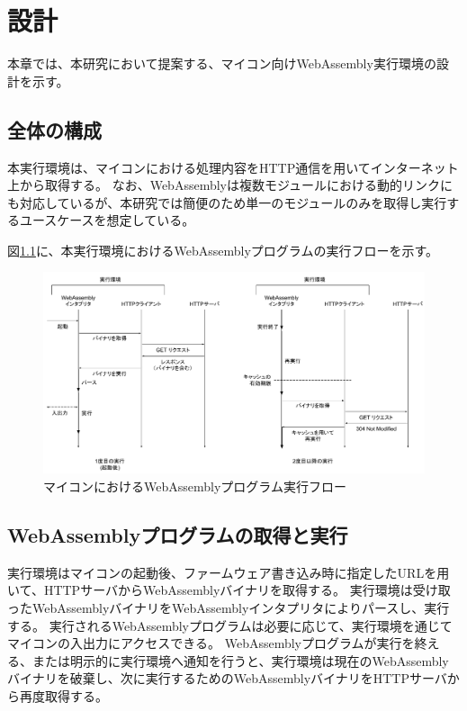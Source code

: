 \chapter{設計}
\label{chap:design}

本章では、本研究において提案する、マイコン向けWebAssembly実行環境の設計を示す。

\section{全体の構成}

本実行環境は、マイコンにおける処理内容をHTTP通信を用いてインターネット上から取得する。
なお、WebAssemblyは複数モジュールにおける動的リンクにも対応しているが、本研究では簡便のため単一のモジュールのみを取得し実行するユースケースを想定している。

図\ref{fig:wasm_design}に、本実行環境におけるWebAssemblyプログラムの実行フローを示す。

\begin{figure}[htbp]
  \caption{マイコンにおけるWebAssemblyプログラム実行フロー}
  \label{fig:wasm_design}
  \begin{center}
    \includegraphics[bb=0 0 1000 530,width=15cm]{img/wasm_design.pdf}
  \end{center}
\end{figure}

\section{WebAssemblyプログラムの取得と実行}

実行環境はマイコンの起動後、ファームウェア書き込み時に指定したURLを用いて、HTTPサーバからWebAssemblyバイナリを取得する。
実行環境は受け取ったWebAssemblyバイナリをWebAssemblyインタプリタによりパースし、実行する。
実行されるWebAssemblyプログラムは必要に応じて、実行環境を通じてマイコンの入出力にアクセスできる。
WebAssemblyプログラムが実行を終える、または明示的に実行環境へ通知を行うと、実行環境は現在のWebAssemblyバイナリを破棄し、次に実行するためのWebAssemblyバイナリをHTTPサーバから再度取得する。

